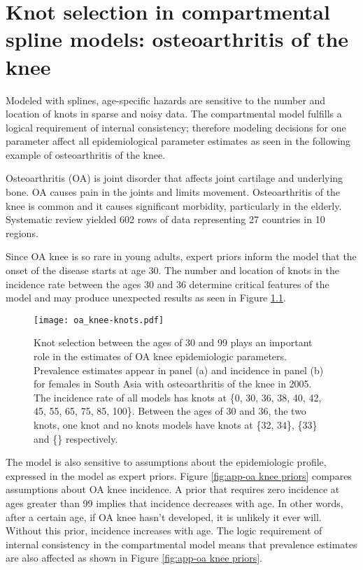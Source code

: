 \chapter{Knot selection in compartmental spline models: osteoarthritis of the knee}
\label{applications-con_fit_splines}

Modeled with splines, age-specific hazards are sensitive to the number and location of knots in sparse and noisy data.  The compartmental model fulfills a logical requirement of internal consistency; therefore modeling decisions for one parameter affect all epidemiological parameter estimates as seen in the following example of osteoarthritis of the knee.

Osteoarthritis (OA) is joint disorder that affects joint cartilage and underlying bone.  OA causes pain in the joints and limits movement.  Osteoarthritis of the knee is common and it causes significant morbidity, particularly in the elderly. \cite{felson_epidemiology_1988, felson_incidence_1995}  Systematic review yielded 602 rows of data representing 27 countries in 10 regions.

Since OA knee is so rare in young adults, expert priors inform the model that the onset of the disease starts at age 30.  The number and location of knots in the incidence rate between the ages 30 and 36 determine critical features of the model and may produce unexpected results as seen in Figure \ref{fig:app-oa knee knots}.

    \begin{figure}[h]
        \begin{center}
            \texttt{[image: oa\_knee-knots.pdf]}
            \caption{Knot selection between the ages of 30 and 99 plays an important role in the estimates of OA knee epidemiologic parameters.  Prevalence estimates appear in panel (a) and incidence in panel (b) for females in South Asia with osteoarthritis of the knee in 2005.  The incidence rate of all models has knots at \{0, 30, 36, 38, 40, 42, 45, 55, 65, 75, 85, 100\}.  Between the ages of 30 and 36, the two knots, one knot and no knots models have knots at \{32, 34\}, \{33\} and \{\} respectively.}
            \label{fig:app-oa knee knots}
        \end{center}
    \end{figure}

The model is also sensitive to assumptions about the epidemiologic profile, expressed in the model as expert priors.  Figure \ref{fig:app-oa knee priors} compares assumptions about OA knee incidence.  A prior that requires zero incidence at ages greater than 99 implies that incidence decreases with age.  In other words, after a certain age, if OA knee hasn't developed, it is unlikely it ever will. Without this prior, incidence increases with age.  The logic requirement of internal consistency in the compartmental model means that prevalence estimates are also affected as shown in Figure \ref{fig:app-oa knee priors}.


